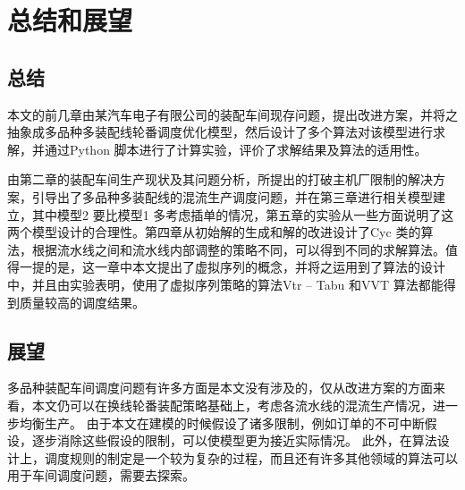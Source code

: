 \chapter{总结和展望}

\section{总结}
本文的前几章由某汽车电子有限公司的装配车间现存问题，提出改进方案，并将之抽象成多品种多装配线轮番调度优化模型，然后设计了多个算法对该模型进行求解，并通过Python 脚本进行了计算实验，评价了求解结果及算法的适用性。

由第二章的装配车间生产现状及其问题分析，所提出的打破主机厂限制的解决方
案，引导出了多品种多装配线的混流生产调度问题，并在第三章进行相关模型建立，其中模型2 要比模型1 多考虑插单的情况，第五章的实验从一些方面说明了这两个模型设计的合理性。第四章从初始解的生成和解的改进设计了Cyc 类的算法，根据流水线之间和流水线内部调整的策略不同，可以得到不同的求解算法。值得一提的是，这一章中本文提出了虚拟序列的概念，并将之运用到了算法的设计中，并且由实验表明，使用了虚拟序列策略的算法Vtr -- Tabu 和VVT 算法都能得到质量较高的调度结果。
\section{展望}
多品种装配车间调度问题有许多方面是本文没有涉及的，仅从改进方案的方面来看，本文仍可以在换线轮番装配策略基础上，考虑各流水线的混流生产情况，进一步均衡生产。
由于本文在建模的时候假设了诸多限制，例如订单的不可中断假设，逐步消除这些假设的限制，可以使模型更为接近实际情况。
此外，在算法设计上，调度规则的制定是一个较为复杂的过程，而且还有许多其他领域的算法可以用于车间调度问题，需要去探索。